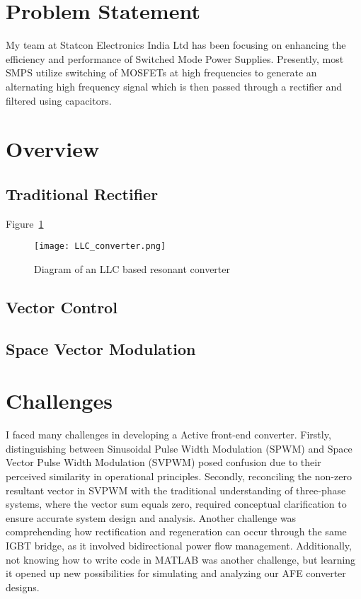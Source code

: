 
\section{Problem Statement}
My team at Statcon Electronics India Ltd has been focusing on enhancing the
efficiency and performance of Switched Mode Power Supplies. Presently, most
SMPS utilize switching of MOSFETs at high frequencies to generate an alternating
high frequency signal which is then passed through a rectifier and filtered using
capacitors.


\section{Overview}

\subsection{Traditional Rectifier}
Figure~\ref{fig:llc_converter}

\begin{figure}[h]
    \centering
    \texttt{[image: LLC\_converter.png]}
    \caption{Diagram of an LLC based resonant converter}
    \label{fig:llc_converter}
\end{figure}

\noindent


\subsection{Vector Control}


\subsection{Space Vector Modulation}


\section{Challenges}
I faced many challenges in developing a Active front-end converter. Firstly,
distinguishing between Sinusoidal Pulse Width Modulation (SPWM) and Space
Vector Pulse Width Modulation (SVPWM) posed confusion due to their perceived
similarity in operational principles. Secondly, reconciling the non-zero
resultant vector in SVPWM with the traditional understanding of three-phase
systems, where the vector sum equals zero, required conceptual clarification to
ensure accurate system design and analysis. Another challenge was comprehending
how rectification and regeneration can occur through the same IGBT bridge, as
it involved bidirectional power flow management. Additionally, not knowing how
to write code in MATLAB was another challenge, but learning it opened up new
possibilities for simulating and analyzing our AFE converter designs.